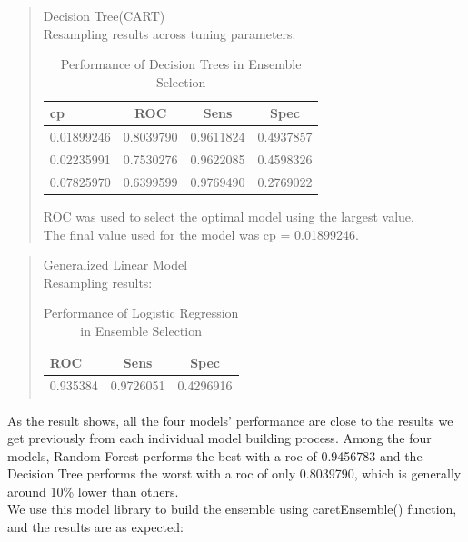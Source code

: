 \documentclass[12pt, a4paper, bibliography=totoc, english]{scrartcl}
\begin{document}
\begin{quote} 
	Decision Tree(CART) \\
	Resampling results across tuning parameters:
	\begin{table}[htbp]
		\centering
		\begin{tabular}{|l|c|c|c|}\hline
			\bfseries cp &\bfseries ROC &\bfseries Sens &\bfseries Spec\\\hline\hline
			0.01899246 & 0.8039790 & 0.9611824 & 0.4937857\\\hline
			0.02235991 & 0.7530276 & 0.9622085 & 0.4598326\\\hline
			0.07825970 & 0.6399599 & 0.9769490 & 0.2769022\\\hline
			
		\end{tabular}
		\caption{Performance of Decision Trees in Ensemble Selection}
	\end{table}
	ROC was used to select the optimal model using the largest value.\\
	The final value used for the model was cp = 0.01899246.
	
	
\end{quote}
\begin{quote} 
	Generalized Linear Model \\
	Resampling results:
	\begin{table}[htbp]
		\centering
		\begin{tabular}{|l|c|c|}\hline
			\bfseries ROC &\bfseries Sens &\bfseries Spec\\\hline\hline
			0.935384 & 0.9726051 & 0.4296916\\\hline
			
			
		\end{tabular}
		\caption{Performance of Logistic Regression in Ensemble Selection}
	\end{table}
	
\end{quote}
As the result shows, all the four models’ performance are close to the results we get previously from each individual model building process. Among the four models, Random Forest performs the best with a roc of 0.9456783 and the Decision Tree performs the worst with a roc of only 0.8039790, which is generally around 10\% lower than others.\\
We use this model library to build the ensemble using caretEnsemble() function, and the results are as expected:
\end{document}
